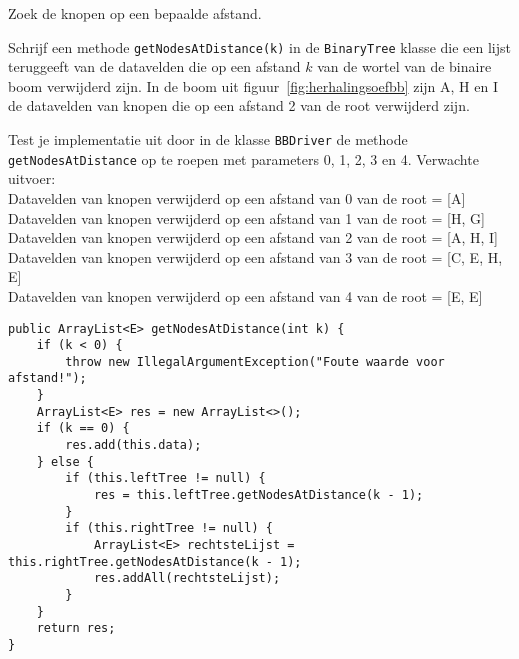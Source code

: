 \begin{oef}
\code Zoek de knopen op een bepaalde afstand.
\begin{oefenumerate}
\item Schrijf een methode \verb=getNodesAtDistance(k)= in de \verb+BinaryTree+ klasse die een lijst teruggeeft van de datavelden die op een afstand $k$ van de wortel van de binaire boom verwijderd zijn. In de boom uit figuur~\ref{fig:herhalingsoefbb} zijn A, H en I de datavelden van knopen die op een afstand 2 van de root verwijderd zijn.
\item Test je implementatie uit door in de klasse \verb+BBDriver+ de methode \verb+getNodesAtDistance+ op te roepen met parameters 0, 1, 2, 3 en 4. Verwachte uitvoer: \\
Datavelden van knopen verwijderd op een afstand van 0 van de root = [A]\\
Datavelden van knopen verwijderd op een afstand van 1 van de root = [H, G]\\
Datavelden van knopen verwijderd op een afstand van 2 van de root = [A, H, I]\\
Datavelden van knopen verwijderd op een afstand van 3 van de root = [C, E, H, E]\\
Datavelden van knopen verwijderd op een afstand van 4 van de root = [E, E]
\end{oefenumerate}

\begin{opl}
\begin{lstlisting}[caption={getNodesAtDistance(k) methode}, label=herhoefbbdistance]
public ArrayList<E> getNodesAtDistance(int k) {
	if (k < 0) {
		throw new IllegalArgumentException("Foute waarde voor afstand!");
	}
	ArrayList<E> res = new ArrayList<>();
	if (k == 0) {
		res.add(this.data);
	} else {
		if (this.leftTree != null) {
			res = this.leftTree.getNodesAtDistance(k - 1);
		}
		if (this.rightTree != null) {
			ArrayList<E> rechtsteLijst = this.rightTree.getNodesAtDistance(k - 1);
			res.addAll(rechtsteLijst);
		}
	}
	return res;
}
\end{lstlisting}
\end{opl}
\end{oef}



